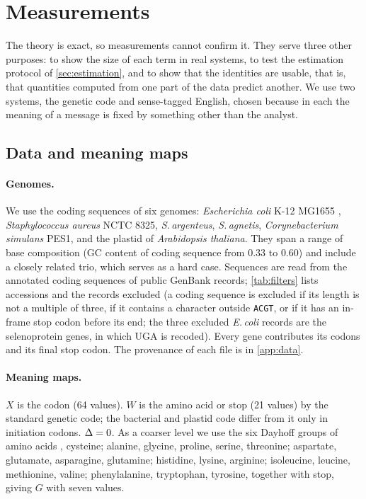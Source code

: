 \section{Measurements}\label{sec:measurements}
The theory is exact, so measurements cannot confirm it. They serve three other purposes: to show the size of each term in real systems, to test the estimation protocol of \cref{sec:estimation}, and to show that the identities are usable, that is, that quantities computed from one part of the data predict another. We use two systems, the genetic code and sense-tagged English, chosen because in each the meaning of a message is fixed by something other than the analyst.

\subsection{Data and meaning maps}\label{sec:data}
\paragraph{Genomes.} We use the coding sequences of six genomes: \emph{Escherichia coli} K-12 MG1655 \citep{blattner1997}, \emph{Staphylococcus aureus} NCTC 8325, \emph{S.\,argenteus}, \emph{S.\,agnetis}, \emph{Corynebacterium simulans} PES1, and the plastid of \emph{Arabidopsis thaliana}. They span a range of base composition (GC content of coding sequence from $0.33$ to $0.60$) and include a closely related trio, which serves as a hard case. Sequences are read from the annotated coding sequences of public GenBank records; \cref{tab:filters} lists accessions and the records excluded (a coding sequence is excluded if its length is not a multiple of three, if it contains a character outside \texttt{ACGT}, or if it has an in-frame stop codon before its end; the three excluded \emph{E.\,coli} records are the selenoprotein genes, in which UGA is recoded). Every gene contributes its codons and its final stop codon. The provenance of each file is in \cref{app:data}.
\begin{table}[tbp]
\caption{Coding sequences used, with the filters applied.}\label{tab:filters}
\centering\small

\end{table}
\paragraph{Meaning maps.} $X$ is the codon (64 values). $W$ is the amino acid or stop (21 values) by the standard genetic code; the bacterial and plastid code differ from it only in initiation codons. $\Delta=0$. As a coarser level we use the six Dayhoff groups of amino acids \citep{dayhoff1978}, cysteine; alanine, glycine, proline, serine, threonine; aspartate, glutamate, asparagine, glutamine; histidine, lysine, arginine; isoleucine, leucine, methionine, valine; phenylalanine, tryptophan, tyrosine, together with stop, giving $G$ with seven values.
